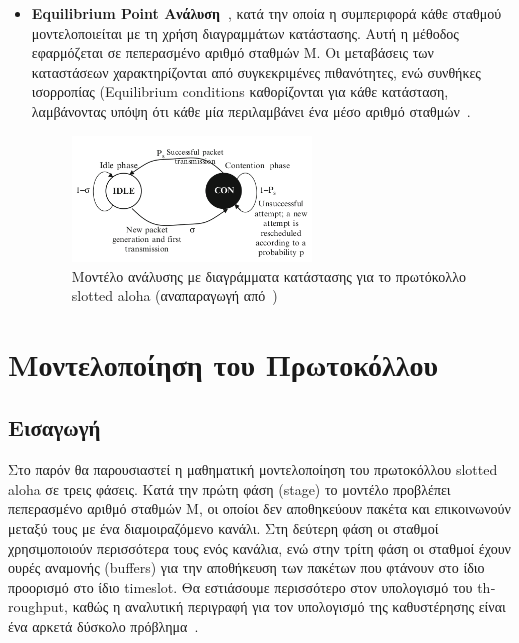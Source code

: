 \documentclass[12pt]{report}
\begin{document}
\begin{itemize}
  \item \textbf{\textlatin{Equilibrium Point} Ανάλυση~\cite{book:01}}, κατά την οποία η συμπεριφορά κάθε σταθμού μοντελοποιείται με τη χρήση διαγραμμάτων κατάστασης. Αυτή η μέθοδος εφαρμόζεται σε πεπερασμένο αριθμό σταθμών \textlatin{M}. Οι μεταβάσεις των καταστάσεων χαρακτηρίζονται από συγκεκριμένες πιθανότητες, ενώ συνθήκες ισορροπίας (\textlatin{Equilibrium conditions} καθορίζονται για κάθε κατάσταση, λαμβάνοντας υπόψη ότι κάθε μία περιλαμβάνει ένα μέσο αριθμό σταθμών~\cite{book:03}.

  \begin{figure}[ht]
  \centering
  \includegraphics[width=0.6\textwidth]{state_dia}
  \caption{Μοντέλο ανάλυσης με διαγράμματα κατάστασης για το πρωτόκολλο \textlatin{slotted aloha} (αναπαραγωγή από~\cite{book:01})}
  \label{fig:state_dia}
  \end{figure}

\end{itemize}

\chapter{Μοντελοποίηση του Πρωτοκόλλου}\label{ch2}

\section{Εισαγωγή}
Στο παρόν θα παρουσιαστεί η μαθηματική μοντελοποίηση του πρωτοκόλλου \textlatin{slotted aloha} σε τρεις φάσεις. Κατά την πρώτη φάση (\textlatin{stage}) το μοντέλο προβλέπει πεπερασμένο αριθμό σταθμών \textlatin{M}, οι οποίοι δεν αποθηκεύουν πακέτα και επικοινωνούν μεταξύ τους με
ένα διαμοιραζόμενο κανάλι. Στη δεύτερη φάση οι σταθμοί χρησιμοποιούν περισσότερα τους ενός κανάλια, ενώ στην τρίτη φάση οι σταθμοί έχουν ουρές αναμονής (\textlatin{buffers}) για την αποθήκευση των πακέτων που φτάνουν στο ίδιο προορισμό στο ίδιο \textlatin{timeslot}. Θα εστιάσουμε περισσότερο στον υπολογισμό του \textlatin{throughput}, καθώς η αναλυτική περιγραφή για τον υπολογισμό της καθυστέρησης είναι ένα αρκετά δύσκολο πρόβλημα~\cite{book:05}.
\end{document}
